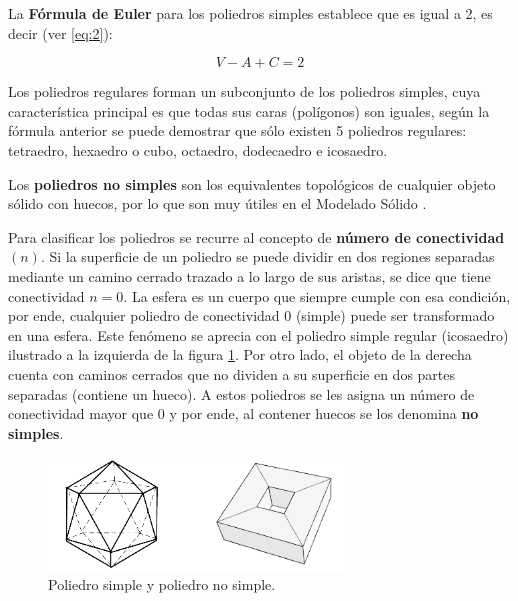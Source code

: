     La \textbf{Fórmula de Euler} para los poliedros simples
    establece que  \cite{Ramos2011} es igual a 2, es decir (ver \ref{eq:2}):

    \begin{equation}
    V - A  +  C = 2
    \label{eq:2}
    \end{equation}
    
    Los poliedros regulares forman un subconjunto de los poliedros simples, cuya característica principal es que todas sus caras (polígonos) son iguales, según la fórmula anterior se puede demostrar que sólo existen 5 poliedros regulares: tetraedro, hexaedro o cubo, octaedro, dodecaedro e icosaedro.
    
    
Los \textbf{poliedros no simples} son los equivalentes topológicos de cualquier objeto sólido con huecos, por lo que son muy útiles en el Modelado Sólido \citep{Ramos2011}. 

    
    Para clasificar los poliedros se recurre al concepto de \textbf{número de conectividad}  $(n)$. Si la superficie de un poliedro se puede dividir en dos regiones separadas mediante un camino cerrado trazado a lo largo de sus aristas, se dice que tiene conectividad $n = 0$. La esfera es un cuerpo que siempre cumple con esa condición, por ende, cualquier poliedro de conectividad $0$ (simple) puede ser transformado en una esfera. Este fenómeno se aprecia con el poliedro simple regular (icosaedro) ilustrado a la izquierda de la figura \ref{fig:polino}. 
    Por otro lado, el objeto de la derecha cuenta con caminos cerrados que no dividen a su superficie en dos partes separadas (contiene un hueco). A estos poliedros se les asigna un número de conectividad mayor que $0$ y por ende, al contener huecos se los denomina \textbf{no simples}.
    
    
    \begin{figure}[ht]
    \includegraphics[width=8cm]{Img/GEO/geo-simple-nosimple.png}
    \centering
    \caption{\footnotesize{Poliedro simple y poliedro no simple.}}
    \label{fig:polino}
    \end{figure}
    
